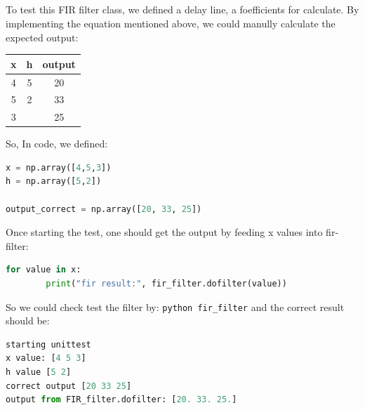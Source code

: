\documentclass[a4paper,12pt]{article}
\begin{document}
\subsection{}
To test this FIR filter class, we defined a delay line, a foefficients for calculate. By implementing the equation mentioned above, we could manully calculate the expected output:
\begin{center}
\begin{tabular}{ccc}
\hline
x& h& output\\
\hline
4&5&20\\
\hline
5&2&33\\
\hline
3& &25\\
\hline
\end{tabular}
\end{center}
So, In code, we defined:
\begin{lstlisting}[language=Python]
x = np.array([4,5,3])
h = np.array([5,2])

output_correct = np.array([20, 33, 25])
\end{lstlisting}
Once starting the test, one should get the output by feeding x values into fir-filter:
\begin{lstlisting}[language=Python]
for value in x:
		print("fir result:", fir_filter.dofilter(value)) 
\end{lstlisting}
So we could check test the filter by: \lstinline|python fir_filter| and the correct result should be:
\begin{lstlisting}[language=Python]
starting unittest
x value: [4 5 3]
h value [5 2]
correct output [20 33 25]
output from FIR_filter.dofilter: [20. 33. 25.]
\end{lstlisting}
\end{document}
